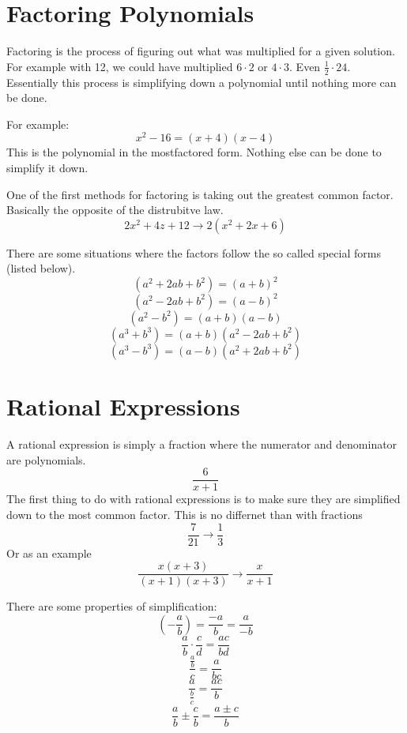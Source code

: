 \documentclass[12pt, letterpaper, oneside]{book}
\begin{document}
\section{Factoring Polynomials}
Factoring is the process of figuring out what was multiplied for a given solution. For example with 12, we could have multiplied $6\cdot2$ or $4\cdot3$. Even $\frac{1}{2}\cdot24$. Essentially this process is simplifying down a polynomial until nothing more can be done.

For example:
\[x^2 - 16 = (x+4)(x-4)\]
This is the polynomial in the mostfactored form. Nothing else can be done to simplify it down.

One of the first methods for factoring is taking out the greatest common factor. Basically the opposite of the distrubitve law.
\[2x^2+4z+12 \rightarrow 2(x^2+2x+6)\]

There are some situations where the factors follow the so called special forms (listed below).
\begin{equation}
    (a^2 + 2ab + b^2) = (a+b)^2
\end{equation}
\begin{equation}
    (a^2 - 2ab + b^2) = (a-b)^2
\end{equation}
\begin{equation}
    (a^2 - b^2) = (a+b)(a-b)
\end{equation}
\begin{equation}
    (a^3 + b^3) = (a+b)(a^2 - 2ab + b^2)
\end{equation}
\begin{equation}
    (a^3 - b^3) = (a-b)(a^2 + 2ab + b^2)
\end{equation}

\section{Rational Expressions}
A rational expression is simply a fraction where the numerator and denominator are polynomials.
\[\frac{6}{x+1}\]
The first thing to do with rational expressions is to make sure they are simplified down to the most common factor. This is no differnet than with fractions
\[\frac{7}{21} \rightarrow \frac{1}{3}\]
Or as an example
\[\frac{x(x+3)}{(x+1)(x+3)} \rightarrow \frac{x}{x+1}\]

There are some properties of simplification:
\begin{equation}
    \left(- \frac{a}{b} \right) = \frac{-a}{b} = \frac{a}{-b}
\end{equation}
\begin{equation}
    \frac{a}{b}\cdot\frac{c}{d} = \frac{ac}{bd}
\end{equation}
\begin{equation}
    \frac{\frac{a}{b}}{c} = \frac{a}{bc}
\end{equation}
\begin{equation}
    \frac{a}{\frac{b}{c}} = \frac{ac}{b}
\end{equation}
\begin{equation}
    \frac{a}{b} \pm \frac{c}{b} = \frac{a \pm c}{b}
\end{equation}
\end{document}
